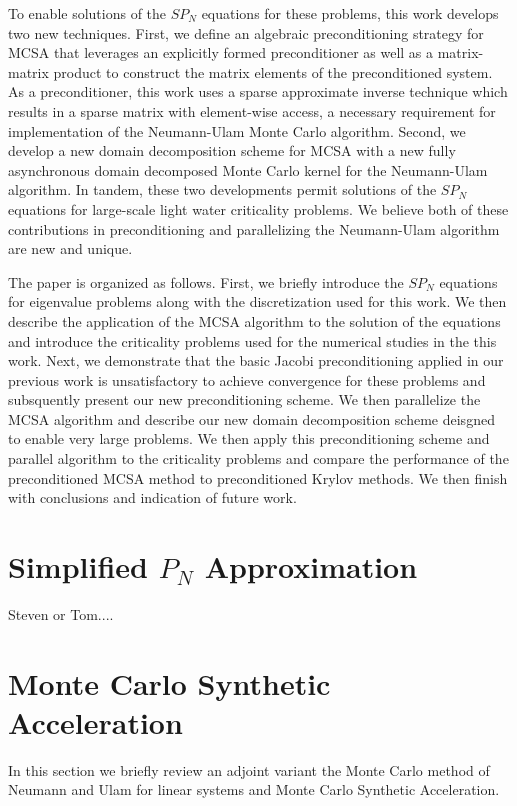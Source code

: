 \documentclass[letterpaper,11pt]{article}
\begin{document}
To enable solutions of the $SP_N$ equations for these problems, this
work develops two new techniques. First, we define an algebraic
preconditioning strategy for MCSA that leverages an explicitly formed
preconditioner as well as a matrix-matrix product to construct the
matrix elements of the preconditioned system. As a preconditioner,
this work uses a sparse approximate inverse technique which results in
a sparse matrix with element-wise access, a necessary requirement for
implementation of the Neumann-Ulam Monte Carlo algorithm. Second, we
develop a new domain decomposition scheme for MCSA with a new fully
asynchronous domain decomposed Monte Carlo kernel for the Neumann-Ulam
algorithm. In tandem, these two developments permit solutions of the
$SP_N$ equations for large-scale light water criticality problems. We
believe both of these contributions in preconditioning and
parallelizing the Neumann-Ulam algorithm are new and unique.

The paper is organized as follows. First, we briefly introduce the
$SP_N$ equations for eigenvalue problems along with the discretization
used for this work. We then describe the application of the MCSA
algorithm to the solution of the equations and introduce the
criticality problems used for the numerical studies in the this
work. Next, we demonstrate that the basic Jacobi preconditioning
applied in our previous work is unsatisfactory to achieve convergence
for these problems and subsquently present our new preconditioning
scheme. We then parallelize the MCSA algorithm and describe our new
domain decomposition scheme deisgned to enable very large problems. We
then apply this preconditioning scheme and parallel algorithm to the
criticality problems and compare the performance of the preconditioned
MCSA method to preconditioned Krylov methods. We then finish with
conclusions and indication of future work.

\section{Simplified $P_N$ Approximation}

Steven or Tom....

\section{Monte Carlo Synthetic Acceleration}
\label{sec:mcsa}
In this section we briefly review an adjoint variant the Monte Carlo
method of Neumann and Ulam for linear systems and Monte Carlo
Synthetic Acceleration.
\end{document}
